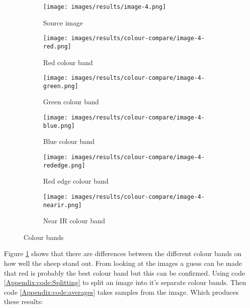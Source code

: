 \begin{figure}[H]
    \centering

\begin{subfigure}{.5\textwidth}
    \centering
    \texttt{[image: images/results/image-4.png]}
    \caption{Source image}

\end{subfigure}%
\begin{subfigure}{.5\textwidth}
\centering
    \texttt{[image: images/results/colour-compare/image-4-red.png]}
    \caption{Red colour band}

\end{subfigure}
\begin{subfigure}{.5\textwidth}
\centering
    \texttt{[image: images/results/colour-compare/image-4-green.png]}
    \caption{Green colour band}

\end{subfigure}%
\begin{subfigure}{.5\textwidth}
\centering
    \texttt{[image: images/results/colour-compare/image-4-blue.png]}
    \caption{Blue colour band}

\end{subfigure}
\begin{subfigure}{.5\textwidth}
\centering
    \texttt{[image: images/results/colour-compare/image-4-rededge.png]}
    \caption{Red edge colour band}

\end{subfigure}%
\begin{subfigure}{.5\textwidth}
\centering
    \texttt{[image: images/results/colour-compare/image-4-nearir.png]}
    \caption{Near IR colour band}

\end{subfigure}
    \caption{Colour bands}
    \label{fig:colour-bands}
\end{figure}

Figure \ref{fig:colour-bands} shows that there are differences between the different colour bands on how well the sheep stand out. From looking at the images a guess can be made that red is probably the best colour band but this can be confirmed. Using code \ref{Appendix:code:Splitting} to split an image into it's separate colour bands. Then code \ref{Appendix:code:averages} takes samples from the image. Which produces these results:

